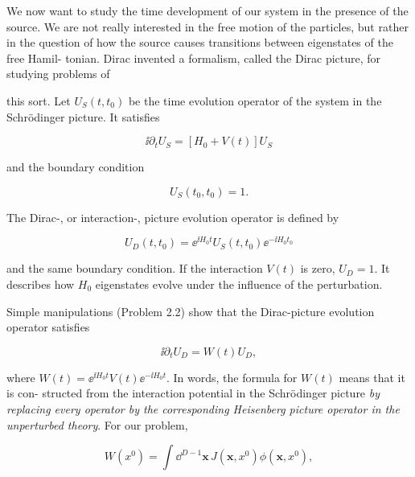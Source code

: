 We now want to study the time development of our system in the presence of the
source. We are not really interested in the free motion of the particles, but rather in the
question of how the source causes transitions between eigenstates of the free Hamil-
tonian. Dirac invented a formalism, called the Dirac picture, for studying problems of

this sort. Let $U_S(t,t_0)$ be the time evolution operator of the system in the Schrödinger
picture. It satisfies

\begin{equation}
\ii\partial_tU_S=[H_0+V(t)]U_S
\label{eq:2.9}
\end{equation}

and the boundary condition

\begin{equation}
U_S(t_0,t_0)=1.
\label{eq:2.10}
\end{equation}

The Dirac-, or interaction-, picture evolution operator is defined by

\begin{equation}
U_D(t,t_0)=\ee^{\ii H_0t}U_S(t,t_0)\ee^{-\ii H_0t_0}
\label{eq:2.11}
\end{equation}

and the same boundary condition. If the interaction $V(t)$ is zero, $U_D=1$. It describes
how $H_0$ eigenstates evolve under the influence of the perturbation.

Simple manipulations (Problem 2.2) show that the Dirac-picture evolution operator
satisfies

\begin{equation}
\ii\partial_tU_D=W(t)U_D,
\label{eq:2.12}
\end{equation}

where $W(t)=\ee^{\ii H_0t}V(t)\ee^{-\ii H_0t}$. In words, the formula for $W(t)$ means that it is con-
structed from the interaction potential in the Schrödinger picture \emph{by replacing every
operator by the corresponding Heisenberg picture operator in the unperturbed theory}. For
our problem,

\begin{equation}
W(x^0)=\int\dd^{D-1}\mathbf x\,J(\mathbf x,x^0)\phi(\mathbf x,x^0),
\label{eq:2.13}
\end{equation}

